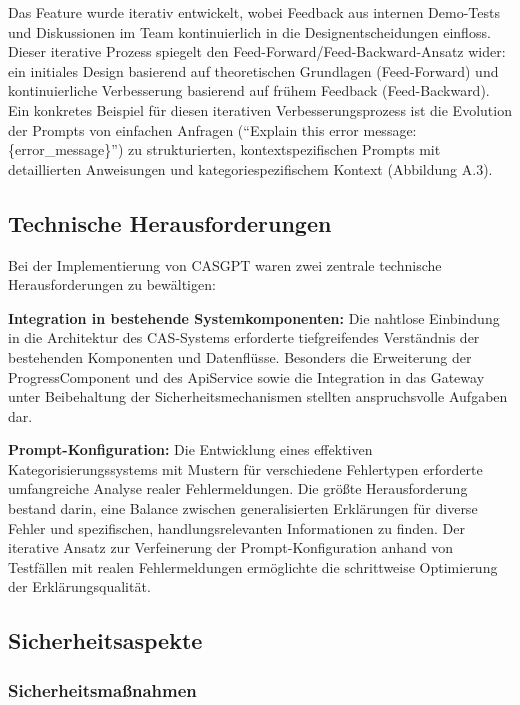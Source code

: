 \documentclass[
  a4paper,
  12pt,
  oneside,
  open=any,
  BCOR=12mm,
  DIV=14,
  parskip=half*,
  headsepline,
  footsepline,
  pointlessnumbers,
  liststotoc,
  numbers=noenddot,
  listof=totoc]{scrartcl}
\begin{document}
Das Feature wurde iterativ entwickelt, wobei Feedback aus internen
Demo-Tests und Diskussionen im Team kontinuierlich in die
Designentscheidungen einfloss. Dieser iterative Prozess spiegelt den
Feed-Forward/Feed-Backward-Ansatz wider: ein initiales Design basierend
auf theoretischen Grundlagen (Feed-Forward) und kontinuierliche
Verbesserung basierend auf frühem Feedback (Feed-Backward). Ein
konkretes Beispiel für diesen iterativen Verbesserungsprozess ist die
Evolution der Prompts von einfachen Anfragen (``Explain this error
message: \{error\_message\}'') zu strukturierten, kontextspezifischen
Prompts mit detaillierten Anweisungen und kategoriespezifischem Kontext
(Abbildung A.3).

\subsection{Technische
Herausforderungen}\label{technische-herausforderungen}

Bei der Implementierung von CASGPT waren zwei zentrale technische
Herausforderungen zu bewältigen:

\textbf{Integration in bestehende Systemkomponenten:} Die nahtlose
Einbindung in die Architektur des CAS-Systems erforderte tiefgreifendes
Verständnis der bestehenden Komponenten und Datenflüsse. Besonders die
Erweiterung der ProgressComponent und des ApiService sowie die
Integration in das Gateway unter Beibehaltung der Sicherheitsmechanismen
stellten anspruchsvolle Aufgaben dar.

\textbf{Prompt-Konfiguration:} Die Entwicklung eines effektiven
Kategorisierungssystems mit Mustern für verschiedene Fehlertypen
erforderte umfangreiche Analyse realer Fehlermeldungen. Die größte
Herausforderung bestand darin, eine Balance zwischen generalisierten
Erklärungen für diverse Fehler und spezifischen, handlungsrelevanten
Informationen zu finden. Der iterative Ansatz zur Verfeinerung der
Prompt-Konfiguration anhand von Testfällen mit realen Fehlermeldungen
ermöglichte die schrittweise Optimierung der Erklärungsqualität.

\subsection{Sicherheitsaspekte}\label{sicherheitsaspekte}

\subsubsection{Sicherheitsmaßnahmen}\label{sicherheitsmauxdfnahmen}
\end{document}
